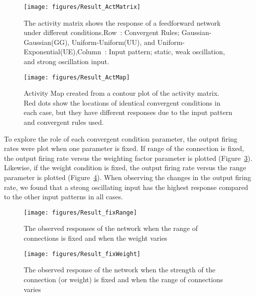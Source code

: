 \begin{figure}[!h]
	\centering
	\texttt{[image: figures/Result\_ActMatrix]}
	\caption[The Activity Matrix]{The activity matrix shows the response of a feedforward network under different conditions.\newline Row~: Convergent Rules; Gaussian-Gaussian(GG), Uniform-Uniform(UU), and Uniform-Exponential(UE),\newline Column~: Input pattern; static, weak oscillation, and strong oscillation input.}
	\label{fig:ActivityMatrix}
\end{figure}

\begin{figure}[!h]
	\centering
	\texttt{[image: figures/Result\_ActMap]}
	\caption[The Activity Map]{Activity Map created from a contour plot of the activity matrix. Red dots show the locations of identical convergent conditions in each case, but they have different responses due to the input pattern and convergent rules used.}
	\label{fig:ActivityMap}
\end{figure}


 To explore the role of each convergent condition parameter, the output firing rates were plot when one parameter is fixed. If range of the connection is fixed, the output firing rate versus the weighting factor parameter is plotted (Figure~\ref{fig:ObservedRfix}). Likewise, if the weight condition is fixed, the output firing rate versus the range parameter is plotted (Figure~\ref{fig:ObservedWfix}). 
When observing the changes in the output firing rate, we found that a strong oscillating input has the highest response compared to the other input patterns in all cases. 


\begin{figure}[!h]
	\centering
	\texttt{[image: figures/Result\_fixRange]}
	\caption[The Observed Network Response (R = constant)]{The observed responses of the network when the range of connections is fixed and when the weight varies}
	\label{fig:ObservedRfix}
\end{figure}

\begin{figure}[!h]
	\centering
	\texttt{[image: figures/Result\_fixWeight]}
	\caption[The Observed Network Response (W = constant)]{The observed response of the network when the strength of the connection (or weight) is fixed and when the range of connections varies}
	\label{fig:ObservedWfix}
\end{figure}

